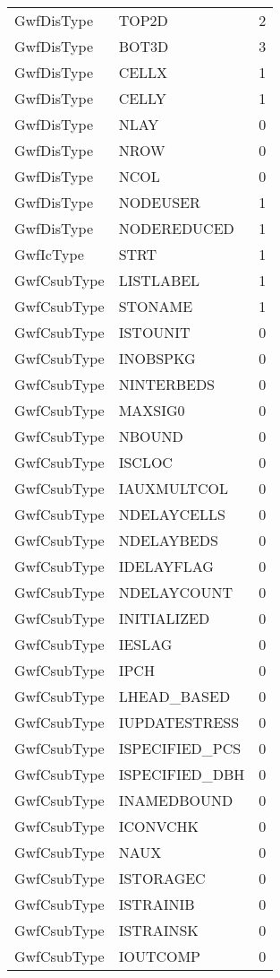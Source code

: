 \begin{longtable}{p{6cm} p{4cm} p{2cm} }
GwfDisType &  TOP2D & 2 \\ 
GwfDisType &  BOT3D & 3 \\ 
GwfDisType &  CELLX & 1 \\ 
GwfDisType &  CELLY & 1 \\ 
GwfDisType &  NLAY & 0 \\ 
GwfDisType &  NROW & 0 \\ 
GwfDisType &  NCOL & 0 \\ 
GwfDisType &  NODEUSER & 1 \\ 
GwfDisType &  NODEREDUCED & 1 \\ 
GwfIcType &  STRT & 1 \\ 
GwfCsubType &  LISTLABEL & 1 \\ 
GwfCsubType &  STONAME & 1 \\ 
GwfCsubType &  ISTOUNIT & 0 \\ 
GwfCsubType &  INOBSPKG & 0 \\ 
GwfCsubType &  NINTERBEDS & 0 \\ 
GwfCsubType &  MAXSIG0 & 0 \\ 
GwfCsubType &  NBOUND & 0 \\ 
GwfCsubType &  ISCLOC & 0 \\ 
GwfCsubType &  IAUXMULTCOL & 0 \\ 
GwfCsubType &  NDELAYCELLS & 0 \\ 
GwfCsubType &  NDELAYBEDS & 0 \\ 
GwfCsubType &  IDELAYFLAG & 0 \\ 
GwfCsubType &  NDELAYCOUNT & 0 \\ 
GwfCsubType &  INITIALIZED & 0 \\ 
GwfCsubType &  IESLAG & 0 \\ 
GwfCsubType &  IPCH & 0 \\ 
GwfCsubType &  LHEAD\_BASED & 0 \\ 
GwfCsubType &  IUPDATESTRESS & 0 \\ 
GwfCsubType &  ISPECIFIED\_PCS & 0 \\ 
GwfCsubType &  ISPECIFIED\_DBH & 0 \\ 
GwfCsubType &  INAMEDBOUND & 0 \\ 
GwfCsubType &  ICONVCHK & 0 \\ 
GwfCsubType &  NAUX & 0 \\ 
GwfCsubType &  ISTORAGEC & 0 \\ 
GwfCsubType &  ISTRAINIB & 0 \\ 
GwfCsubType &  ISTRAINSK & 0 \\ 
GwfCsubType &  IOUTCOMP & 0 \\ 

\end{longtable}
